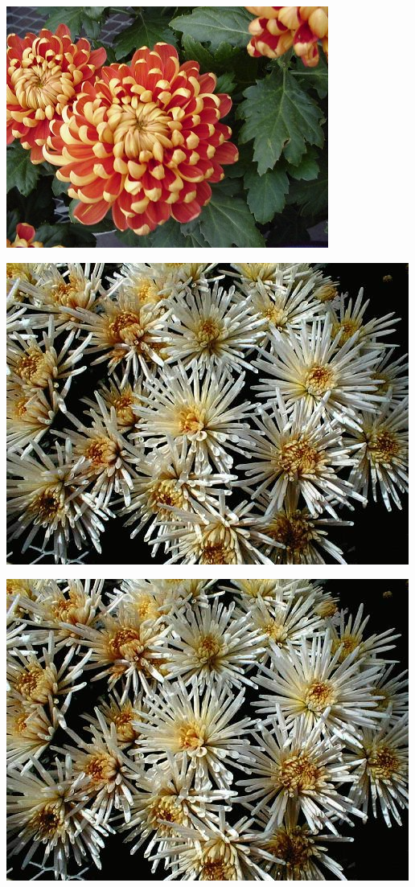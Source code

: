 \documentclass{article}
\begin{document}
\begin{center}
\includegraphics[height=0.9\textheight, angle=90]{../Chrysanthemum_PianoCopper.jpg}
\end{center}
\newpage

\begin{center}
\includegraphics[height=0.9\textheight, angle=90]{../Chrysanthemum_Quill.jpg}
\end{center}
\newpage

\begin{center}
\includegraphics[height=0.9\textheight, angle=90]{../Chrysanthemum_Quill2.jpg}
\end{center}
\newpage
\end{document}
